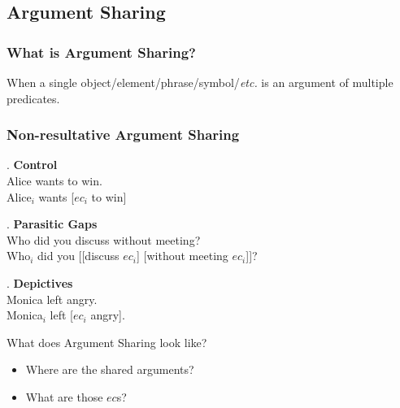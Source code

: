 \documentclass[
]{beamer}
\begin{document}
\subsection{Argument Sharing}
\begin{frame}
  \frametitle{What is Argument Sharing?}
  When a single object/element/phrase/symbol/\textit{etc.} is an argument of multiple predicates.
\end{frame}
\begin{frame}
  \frametitle{Non-resultative Argument Sharing}
  \pause
  \ex. \textbf{Control}\\
    {\rm Alice wants to win.}\\
    Alice$_i$ wants [$ec_i$ to win]

  \pause
\ex. \textbf{Parasitic Gaps}\\
    {\rm Who did you discuss without meeting?}\\
    Who$_i$ did you [[discuss $ec_i$] [without meeting $ec_i$]]?
    
    \pause
    \ex. \textbf{Depictives}\\
    {\rm Monica left angry.}\\
    Monica$_i$ left [$ec_i$ angry].

\end{frame}
\begin{frame}
  {What does Argument Sharing look like?}
  \begin{itemize}
    \item Where are the shared arguments?
    \item What are those $ec$s?
  \end{itemize}
  
\end{frame}


\end{document}
